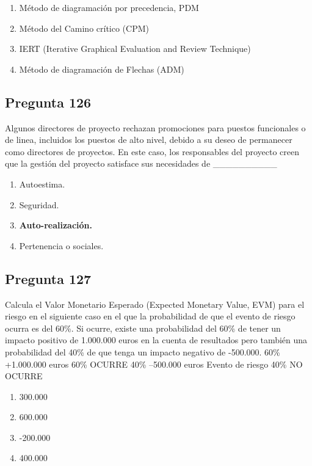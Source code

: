 \documentclass[11pt,a4paper]{article}
\begin{document}
\begin{enumerate}[label=\alph*)]
  \item Método de diagramación por precedencia, PDM
  \item Método del Camino crítico (CPM)
  \item IERT (Iterative Graphical Evaluation and Review Technique)
  \item Método de diagramación de Flechas (ADM)
\end{enumerate}

\subsection*{Pregunta 126}
Algunos directores de proyecto rechazan promociones para puestos funcionales o de linea, incluidos los puestos de alto nivel, debido a su deseo de permanecer como directores de proyectos. En este caso, los responsables del proyecto creen que la gestión del proyecto satisface sus necesidades de \_\_\_\_\_\_\_\_\_\_

\begin{enumerate}[label=\alph*)]
  \item Autoestima.
  \item Seguridad.
  \item \textbf{Auto-realización.}
  \item Pertenencia o sociales.
\end{enumerate}

\subsection*{Pregunta 127}
Calcula el Valor Monetario Esperado (Expected Monetary Value, EVM) para el riesgo en el siguiente caso en el que la probabilidad de que el evento de riesgo ocurra es del 60\%. Si ocurre, existe una probabilidad del 60\% de tener un impacto positivo de 1.000.000 euros en la cuenta de resultados pero también una probabilidad del 40\% de que tenga un impacto negativo de -500.000. 60\% +1.000.000 euros 60\% OCURRE 40\% --500.000 euros Evento de riesgo 40\% NO OCURRE

\begin{enumerate}[label=\alph*)]
  \item 300.000
  \item 600.000
  \item -200.000
  \item 400.000
\end{enumerate}
\end{document}
